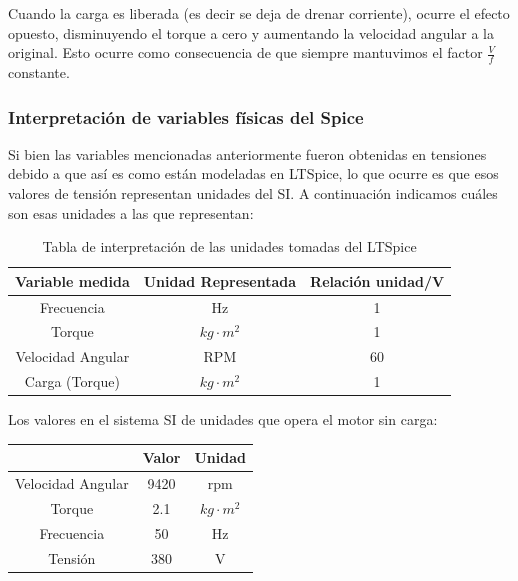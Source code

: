 \documentclass[e4_tp3_main.tex]{subfiles}
\begin{document}

Cuando la carga es liberada (es decir se deja de drenar corriente), ocurre el efecto opuesto, disminuyendo el torque a cero y aumentando la velocidad angular a la original. Esto ocurre como consecuencia de que siempre mantuvimos el factor $\frac{V}{f}$ constante.

\subsubsection{Interpretación de variables físicas del Spice}
Si bien las variables mencionadas anteriormente fueron obtenidas en tensiones debido a que así es como están modeladas en LTSpice, lo que ocurre es que esos valores de tensión representan unidades del SI. A continuación indicamos cuáles son esas unidades a las que representan:

\begin{table}[H]
\centering
\begin{tabular}{@{}ccc@{}}

Variable medida   & Unidad Representada     & Relación unidad/V \\ \midrule
Frecuencia        & Hz                      & 1                 \\
Torque            & $kg \cdot m^2$ & 1                 \\
Velocidad Angular & RPM                     & 60                \\
Carga (Torque)    & $kg \cdot m^2$ & 1                 \\ \bottomrule
\end{tabular}
\caption{Tabla de interpretación de las unidades tomadas del LTSpice}
\end{table}

Los valores en el sistema SI de unidades que opera el motor sin carga:

\begin{table}[h]
\centering
\begin{tabular}{clll|c|c|}
\cline{5-6}
\multicolumn{4}{c|}{}                    & Valor & Unidad \\ \hline
\multicolumn{4}{|c|}{Velocidad Angular} & 9420  & rpm    \\ \hline
\multicolumn{4}{|c|}{Torque}            & 2.1   & $kg \cdot m^2$    \\ \hline
\multicolumn{4}{|c|}{Frecuencia}        & 50    & Hz     \\ \hline
\multicolumn{4}{|c|}{Tensi\'on}           & 380   & V      \\ \hline
\end{tabular}
\end{table}
\end{document}
